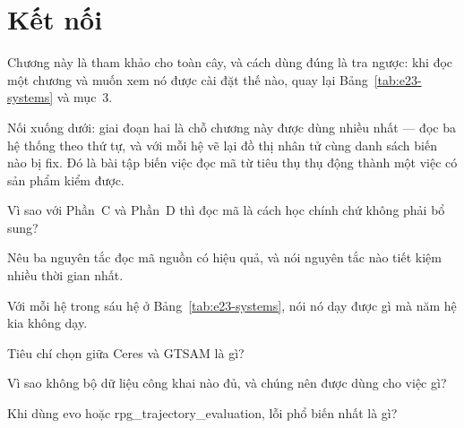 \documentclass[../../vslam.tex]{subfiles}
\begin{document}
\section{Kết nối}

Chương này là tham khảo cho toàn cây, và cách dùng đúng là tra ngược: khi đọc một chương và muốn xem nó được cài đặt thế nào, quay lại Bảng~\ref{tab:e23-systems} và mục~3.

Nối xuống dưới:  giai đoạn hai là chỗ chương này được dùng nhiều nhất --- đọc ba hệ thống theo thứ tự, và với mỗi hệ vẽ lại đồ thị nhân tử cùng danh sách biến nào bị fix. Đó là bài tập biến việc đọc mã từ tiêu thụ thụ động thành một việc có sản phẩm kiểm được.

\begin{tukiem}
\item Vì sao với Phần~C và Phần~D thì đọc mã là cách học chính chứ không phải bổ sung?
\item Nêu ba nguyên tắc đọc mã nguồn có hiệu quả, và nói nguyên tắc nào tiết kiệm nhiều thời gian nhất.
\item Với mỗi hệ trong sáu hệ ở Bảng~\ref{tab:e23-systems}, nói nó dạy được gì mà năm hệ kia không dạy.
\item Tiêu chí chọn giữa Ceres và GTSAM là gì?
\item Vì sao không bộ dữ liệu công khai nào đủ, và chúng nên được dùng cho việc gì?
\item Khi dùng evo hoặc rpg\_trajectory\_evaluation, lỗi phổ biến nhất là gì?
\end{tukiem}
\ifSubfilesClassLoaded{\printbibliography[title={Nguồn}]}{}
\end{document}
